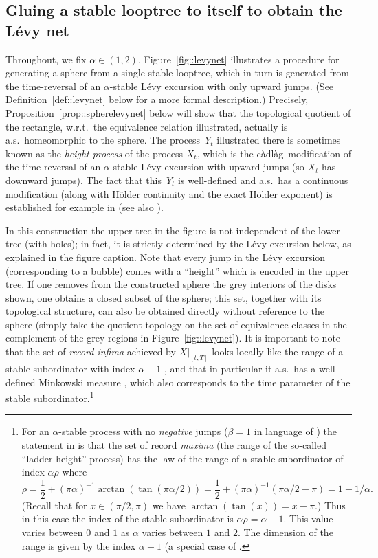 \documentclass[JEP,XML,SOM,Unicode]{cedram}
\theoremstyle{plain}
\numberwithin{theorem}{section}
\theoremstyle{definition}
\newcommand{\cadlag}{càdlàg}
\begin{document}
\subsection{Gluing a stable looptree to itself to obtain the Lévy net}
\label{subsec::spheresassymetricholes}

Throughout, we fix $\alpha \in (1,2)$. Figure~\ref{fig::levynet} illustrates a procedure for generating a sphere from a single stable looptree, which in turn is generated from the time-reversal of an $\alpha$-stable Lévy excursion with only upward jumps. (See Definition~\ref{def::levynet} below for a more formal description.) Precisely, Proposition~\ref{prop::spherelevynet} below will show that the topological quotient of the rectangle, w.r.t.\ the equivalence relation illustrated, actually is a.s.\ homeomorphic to the sphere. The process~$Y_t$ illustrated there is sometimes known as the \emph{height process} of the process $X_t$, which is the \cadlag\ modification of the time-reversal of an $\alpha$-stable Lévy excursion with upward jumps (so $X_t$ has downward jumps). The fact that this~$Y_t$ is well-defined and a.s.\ has a continuous modification (along with Hölder continuity and the exact Hölder exponent) is established for example in \cite[Ths.\,1.4.3 and~1.4.4]{duquesnelegall2005levytrees} (see also \cite{legalllejan1998levytrees}).

In this construction the upper tree in the figure is not independent of the lower tree (with holes); in fact, it is strictly determined by the Lévy excursion below, as explained in the figure caption. Note that every jump in the Lévy excursion (corresponding to a bubble) comes with a ``height'' which is encoded in the upper tree. If one removes from the constructed sphere the grey interiors of the disks shown, one obtains a closed subset of the sphere; this set, together with its topological structure, can also be obtained directly without reference to the sphere (simply take the quotient topology on the set of equivalence classes in the complement of the grey regions in Figure~\ref{fig::levynet}). It is important to note that the set of \emph{record infima} achieved by $X|_{[t,T]}$ looks locally like the range of a stable subordinator with index $\alpha - 1$ \cite[Chap.\,VIII, Lem.\,1]{bertoinlevybook}, and that in particular it a.s.\ has a well-defined Minkowski measure \cite{ft1983local}, which also corresponds to the time parameter of the stable subordinator.\footnote{For an $\alpha$-stable process with no \emph{negative} jumps ($\beta = 1$ in language of \cite{bertoinlevybook}) the statement in \cite[Chap.\,VIII, Lem.\,1]{bertoinlevybook} is that the set of record \emph{maxima} (the range of the so-called ``ladder height'' process) has the law of the range of a stable subordinator of index $\alpha \rho$ where
\[
\rho = \frac12 + (\pi \alpha)^{-1} \arctan (\tan (\pi \alpha/2)) = \frac12 + (\pi\alpha)^{-1} (\pi \alpha/2-\pi) = 1-1/\alpha.
\]
(Recall that for $x \in (\pi/2, \pi)$ we have $\arctan (\tan (x)) = x - \pi$.) Thus in this case the index of the stable subordinator is $\alpha \rho = \alpha - 1 $. This value varies between $0$ and $1$ as $\alpha$ varies between $1$ and $2$. The dimension of the range is given by the index $\alpha - 1$ (a special case of \cite[Chap.\,III, Th.\,15]{bertoinlevybook}.}
\end{document}
